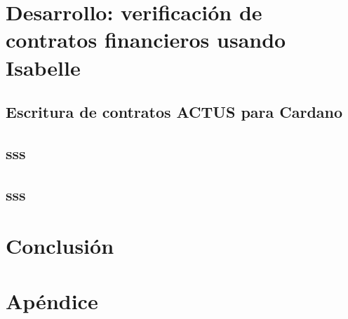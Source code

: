 \documentclass[12pt]{book}
\begin{document}
\chapter{Desarrollo: verificación de contratos financieros usando Isabelle}
\section{Escritura de contratos ACTUS para Cardano}
\section{sss}
\section{sss}


\chapter{Conclusión}


\chapter{Apéndice}




\end{document}
